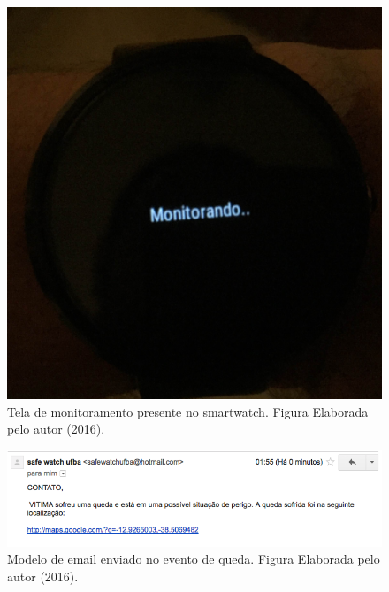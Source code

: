 \begin{figure}
	\centering
	\includegraphics[scale=0.1]{imagens/screen_monitor.png}
	\caption{ Tela de monitoramento presente no smartwatch. Figura Elaborada pelo autor (2016).}
	\label{fig:monitor_screen}
\end{figure}


\begin{figure}[ht]
	\centering
	\includegraphics[scale=0.7]{imagens/mail_example.png}
	\caption{ Modelo de email enviado no evento de queda. Figura Elaborada pelo autor (2016).}
	\label{fig:mail_template}
\end{figure}

